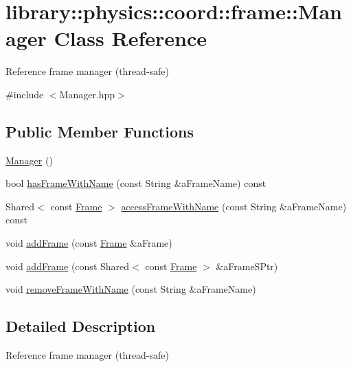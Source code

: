 \hypertarget{classlibrary_1_1physics_1_1coord_1_1frame_1_1_manager}{}\section{library\+:\+:physics\+:\+:coord\+:\+:frame\+:\+:Manager Class Reference}
\label{classlibrary_1_1physics_1_1coord_1_1frame_1_1_manager}


Reference frame manager (thread-\/safe)  




{\ttfamily \#include $<$Manager.\+hpp$>$}

\subsection*{Public Member Functions}
\begin{DoxyCompactItemize}
\item 
\hyperlink{classlibrary_1_1physics_1_1coord_1_1frame_1_1_manager_a5ba1d27be69eed9db6f533b65df96280}{Manager} ()
\item 
bool \hyperlink{classlibrary_1_1physics_1_1coord_1_1frame_1_1_manager_a842f8a8060172178930aed212c4fcf6d}{has\+Frame\+With\+Name} (const String \&a\+Frame\+Name) const
\item 
Shared$<$ const \hyperlink{classlibrary_1_1physics_1_1coord_1_1_frame}{Frame} $>$ \hyperlink{classlibrary_1_1physics_1_1coord_1_1frame_1_1_manager_a13b4885965a111cebff6f04339d81596}{access\+Frame\+With\+Name} (const String \&a\+Frame\+Name) const
\item 
void \hyperlink{classlibrary_1_1physics_1_1coord_1_1frame_1_1_manager_aa4215eb9b956a3b4a2933a33d98b7007}{add\+Frame} (const \hyperlink{classlibrary_1_1physics_1_1coord_1_1_frame}{Frame} \&a\+Frame)
\item 
void \hyperlink{classlibrary_1_1physics_1_1coord_1_1frame_1_1_manager_a65ef93583a62089cb3192527babddab6}{add\+Frame} (const Shared$<$ const \hyperlink{classlibrary_1_1physics_1_1coord_1_1_frame}{Frame} $>$ \&a\+Frame\+S\+Ptr)
\item 
void \hyperlink{classlibrary_1_1physics_1_1coord_1_1frame_1_1_manager_a63e05e289d34f354dafefbff2b8478af}{remove\+Frame\+With\+Name} (const String \&a\+Frame\+Name)
\end{DoxyCompactItemize}


\subsection{Detailed Description}
Reference frame manager (thread-\/safe) 

